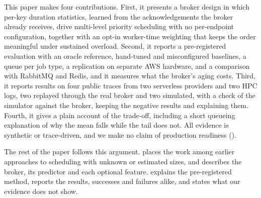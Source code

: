 This paper makes four contributions. First, it presents a broker design in which per-key duration statistics, learned from the acknowledgements the broker already receives, drive multi-level priority scheduling with no per-endpoint configuration, together with an opt-in worker-time weighting that keeps the order meaningful under sustained overload. Second, it reports a pre-registered evaluation with an oracle reference, hand-tuned and misconfigured
baselines, a queue per job type, a replication on separate AWS hardware, and a comparison with RabbitMQ and Redis, and it measures what the broker's aging costs. Third, it reports results on four public traces from two serverless providers and two HPC logs, two replayed through the real broker and two simulated, with a check of the simulator against the broker, keeping the negative results and explaining them. Fourth, it gives a plain account of the trade-off, including a short queueing explanation of why the mean falls while the tail does not. All evidence is synthetic or trace-driven, and we make no claim of production readiness
().

The rest of the paper follows this argument.  places the work among earlier approaches to scheduling with unknown or estimated sizes, and  describes the broker, its predictor and each optional feature.  explains the pre-registered method,  reports the results, successes and failures alike, and  states what our evidence does not show.
